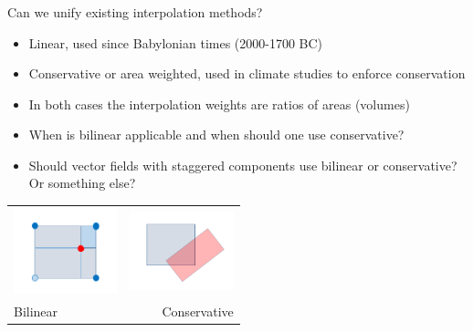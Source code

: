 \documentclass[aspectratio=169]{beamer}
\begin{document}
\begin{frame}[t]
  \frametitle{}
    \begin{block}{Can we unify existing interpolation methods?}
      \begin{itemize}%
	  \item Linear, used since Babylonian times (2000-1700 BC)
      \item Conservative or area weighted, used in climate studies to enforce conservation
      \item In both cases the interpolation weights are ratios of areas (volumes)
      \item When is bilinear applicable and when should one use conservative? 
      \item Should vector fields with staggered components use bilinear or conservative? Or something else?
    \end{itemize}
  \end{block}
  \begin{tabular}{lr}
      \includegraphics[width=30mm]{bilinear.png} &               \includegraphics[width=30mm]{conservative.png} \\
      {Bilinear} & {Conservative}  
\end{tabular}
\end{frame}
\end{document}
